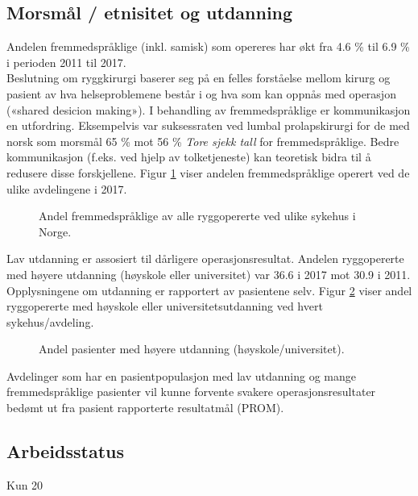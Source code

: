 \subsection{Morsmål / etnisitet og utdanning}



Andelen fremmedspråklige (inkl. samisk) som opereres har økt fra 4.6 \% til 6.9 \% i perioden 2011 til 2017.\\
Beslutning om ryggkirurgi baserer seg på en felles forståelse mellom kirurg og
pasient av hva helseproblemene består i og hva som kan oppnås med operasjon
(«shared desicion making»). I behandling av fremmedspråklige er kommunikasjon
en utfordring. Eksempelvis var suksessraten ved lumbal prolapskirurgi for de med norsk som morsmål 65 \% mot 56 \% 
\textit{Tore sjekk tall} 
for fremmedspråklige. Bedre kommunikasjon (f.eks. ved hjelp av tolketjeneste) kan teoretisk bidra til å redusere disse
forskjellene. Figur \ref{fig:Morsmal} viser andelen fremmedspråklige operert ved de ulike avdelingene i 2017.

\begin{figure}[ht]
\caption{\label{fig:Morsmal} Andel fremmedspråklige av alle ryggopererte ved ulike sykehus i
Norge.}
\end{figure}




Lav utdanning er assosiert til dårligere operasjonsresultat. Andelen ryggopererte med høyere utdanning (høyskole eller universitet) var 36.6 i 2017 mot  30.9 i 2011. 
Opplysningene om utdanning er rapportert av pasientene selv. 
Figur \ref{fig:HoyUtdAvd} viser andel ryggopererte 
med høyskole eller universitetsutdanning ved hvert sykehus/avdeling.


\begin{figure}[ht]
\caption{\label{fig:HoyUtdAvd} Andel pasienter med høyere utdanning (høyskole/universitet).}
\end{figure}


\clearpage
Avdelinger som har en pasientpopulasjon med lav utdanning og mange fremmedspråklige pasienter vil kunne forvente svakere operasjonsresultater bedømt ut fra pasient rapporterte resultatmål (PROM).
\subsection{Arbeidsstatus}
Kun  20%


